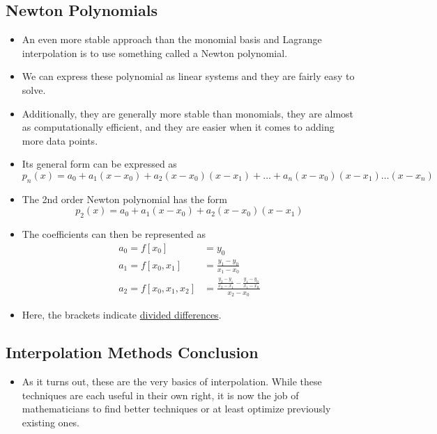 \documentclass{article}
\begin{document}
\subsection*{Newton Polynomials}
\begin{itemize}
\item An even more stable approach than the monomial basis and Lagrange interpolation is to use something called a Newton polynomial.
\item We can express these polynomial as linear systems and they are fairly easy to solve.
\item Additionally, they are generally more stable than monomials, they are almost as computationally efficient, and they are easier when it comes to adding more data points.
\item Its general form can be expressed as
\[
p_n(x) = a_0 + a_1(x-x_0)+a_2(x-x_0)(x-x_1)+\dots+a_n(x-x_0)(x-x_1)\dots(x-x_n)
\]
\item The 2nd order Newton polynomial has the form
\[
p_2(x) = a_0+a_1(x-x_0)+a_2(x-x_0)(x-x_1)
\]
\item The coefficients can then be represented as
\[
\begin{array}{cl}
a_0 = f[x_0] & = y_0 \\
a_1 = f[x_0, x_1] & = \frac{y_1 - y_0}{x_1 - x_0} \\
a_2 = f[x_0, x_1, x_2] & = \frac{\frac{y_2 - y_1}{x_2 - x_1} - \frac{y_1 - y_0}{x_1 - x_0}}{x_2 - x_0}
\end{array}
\]
\item Here, the brackets indicate \underline{divided differences}.
\end{itemize}
\subsection*{Interpolation Methods Conclusion}
\begin{itemize}
\item As it turns out, these are the very basics of interpolation. While these techniques are each useful in their own right, it is now the job of mathematicians to find better techniques or at least optimize previously existing ones. 
\end{itemize}
\end{document}
